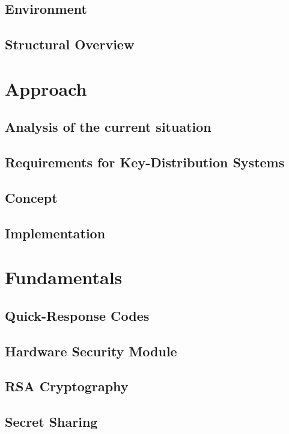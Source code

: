 \documentclass[12pt,oneside,a4paper,parskip]{scrbook}
\begin{document}
\section{Environment}

\section{Structural Overview}

\chapter{Approach}

\section{Analysis of the current situation}

\section{Requirements for Key-Distribution Systems}

\section{Concept}

\section{Implementation}

\chapter{Fundamentals}

\section{Quick-Response Codes}

\section{Hardware Security Module}

\section{RSA Cryptography}

\section{Secret Sharing}
\end{document}
